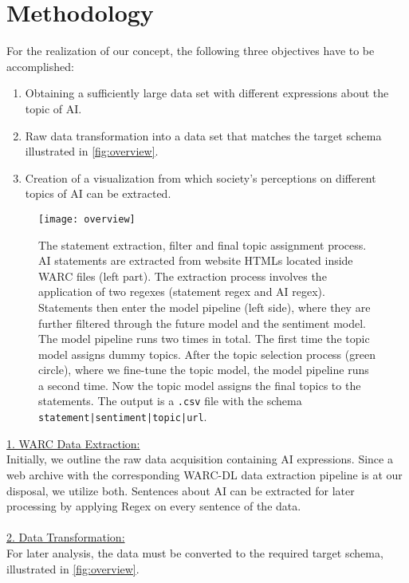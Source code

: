 \section{Methodology}

For the realization of our concept, the following three objectives have to be accomplished:

\begin{enumerate}
    \item Obtaining a sufficiently large data set with different expressions about the topic of AI.
    \item Raw data transformation into a data set that matches the target schema illustrated in \autoref{fig:overview}.
    \item Creation of a visualization from which society's perceptions on different topics of AI can be extracted.
\end{enumerate}%
%
%
\begin{figure}[t]
    \centering
    \texttt{[image: overview]}
    \caption{
        The statement extraction, filter and final topic assignment process.
        AI statements are extracted from website HTMLs located inside WARC files (left part).
        The extraction process involves the application of two regexes (statement regex and AI regex).
        Statements then enter the model pipeline (left side), where they are further filtered through the future model and the sentiment model.
        The model pipeline runs two times in total. The first time the topic model assigns dummy topics.
        After the topic selection process (green circle), where we fine-tune the topic model, the model pipeline runs a second time.
        Now the topic model assigns the final topics to the statements.
        The output is a \texttt{.csv} file with the schema \texttt{statement|sentiment|topic|url}.
    }
    \label{fig:overview}
\end{figure}
\underline{1. WARC Data Extraction:}
\\
Initially, we outline the raw data acquisition containing AI expressions.
Since a web archive with the corresponding WARC-DL data extraction pipeline \citep{Deckers2022} is at our disposal, we utilize both.
Sentences about AI can be extracted for later processing by applying Regex on every sentence of the data.
\\
\\
%
\underline{2. Data Transformation:}
\\
For later analysis, the data must be converted to the required target schema, illustrated in \autoref{fig:overview}.
